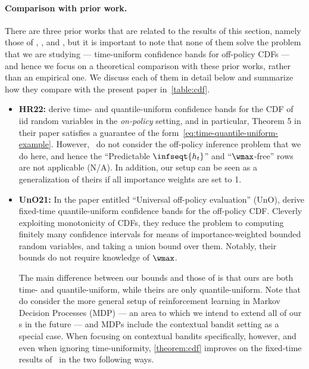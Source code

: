 \paragraph{Comparison with prior work.} There are three prior works that are related to the results of this section, namely those of \citet{howard2022sequential}, \citet{chandak2021universal}, and \citet{huang2021off}, but it is important to note that none of them solve the problem that we are studying --- time-uniform confidence bands for off-policy CDFs --- and hence we focus on a theoretical comparison with these prior works, rather than an empirical one. We discuss each of them in detail below and summarize how they compare with the present paper in~\cref{table:cdf}.

\begin{itemize}
\item \textbf{HR22:} \citet{howard2022sequential} derive time- and quantile-uniform confidence bands for the CDF of iid random variables in the \emph{on-policy} setting, and in particular, Theorem 5 in their paper satisfies a guarantee of the form~\eqref{eq:time-quantile-uniform-example}. However,~\citet{howard2022sequential} do not consider the off-policy inference problem that we do here, and hence the ``Predictable $\infseqt{h_t}$'' and ``$\wmax$-free'' rows are not applicable (N/A). In addition, our setup can be seen as a generalization of theirs if all importance weights are set to 1.

\item \textbf{UnO21:} In the paper entitled ``Universal off-policy evaluation'' (UnO), \citet{chandak2021universal} derive fixed-time quantile-uniform confidence bands for the off-policy CDF\@. Cleverly exploiting monotonicity of CDFs, they reduce the problem to computing finitely many confidence intervals for means of importance-weighted bounded random variables, and taking a union bound over them. Notably, their bounds do not require knowledge of $\wmax$.

  The main difference between our bounds and those of \citet{chandak2021universal} is that ours are both time- and quantile-uniform, while theirs are only quantile-uniform. Note that \citet{chandak2021universal} do consider the more general setup of reinforcement learning in Markov Decision Processes (MDP) --- an area to which we intend to extend all of our \cs{}s in the future --- and MDPs include the contextual bandit setting as a special case. When focusing on contextual bandits specifically, however, and even when ignoring time-uniformity, \cref{theorem:cdf} improves on the fixed-time results of~\citet{chandak2021universal} in the two following ways.


\end{itemize}
